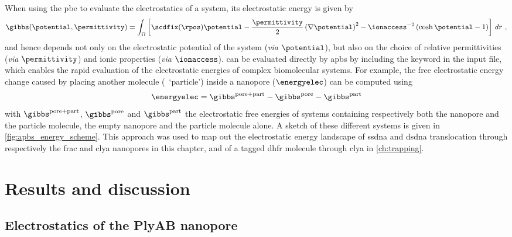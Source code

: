 When using the \gls{pbe} to evaluate the electrostatics of a system, its electrostatic energy is given
by~\cite{Baker-2005}
%
\begin{equation}\label{eq:pbe_energy}
  \gibbs (\potential, \permittivity) = \int_\Omega \left[
    \scdfix(\rpos) \potential
    - \dfrac{\permittivity}{2}\left( \nabla \potential \right)^2
    - \ionaccess^{-2} \left( \cosh \potential - 1 \right)
  \right] \,dr
  \text{ ,}
\end{equation}
%
and hence depends not only on the electrostatic potential of the system (\textit{via} $\potential$), but also
on the choice of relative permittivities (\textit{via} $\permittivity$) and ionic properties (\textit{via}
$\ionaccess$).  can be evaluated directly by \gls{apbs} by including the 
keyword in the input file, which enables the rapid evaluation of the electrostatic energies of complex
biomolecular systems. For example, the free electrostatic energy change caused by placing another molecule
(\ie~`particle') inside a nanopore ($\energyelec$) can be computed using~\cite{Homeyer-2015}
%
\begin{equation}\label{eq:electrostatic_energy}
  \energyelec = \gibbs^{\rm{pore+part}} - \gibbs^{\rm{pore}} - \gibbs^{\rm{part}}
\end{equation}
%
with $\gibbs^{\rm{pore+part}}$, $\gibbs^{\rm{pore}}$ and $\gibbs^{\rm{part}}$ the electrostatic free energies
of systems containing respectively both the nanopore and the particle molecule, the empty nanopore and the
particle molecule alone. A sketch of these different systems is given in \cref{fig:apbs_energy_scheme}. This
approach was used to map out the electrostatic energy landscape of \gls{ssdna} and \gls{dsdna} translocation
through respectively the \gls{frac} and \gls{clya} nanopores in this chapter, and of a tagged \gls{dhfr}
molecule through \gls{clya} in \cref{ch:trapping}.



%
\clearpage
%


\section{Results and discussion}
%
\label{sec:elec:results}
%


\subsection{Electrostatics of the PlyAB nanopore}
%
\label{sec:elec:plyab}
%

